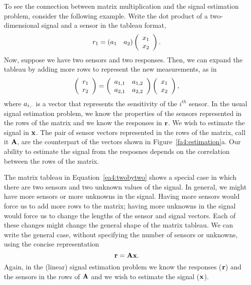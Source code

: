 To see the connection between matrix multiplication and the signal
estimation problem, consider the following example.  Write the dot
product of a two-dimensional signal and a sensor in the tableau
format,
\[
r_1 = 
\left ( \mbox{${a}_{1}$} ~~~ \mbox{${a}_{2}$} \right )
\left (
\begin{array}{c}
 \mbox{${x}_{1}$} \\
 \mbox{${x}_{2}$} \\
\end{array}
\right ) .
\]
Now, suppose we have two sensors and two responses.  Then, we can
expand the tableau by adding more rows to represent the new measurements,
as in
\begin{equation}
\label{ea4:twobytwo}
\left (
 \begin{array}{c}
  \mbox{${r}_{1}$} \\
  \mbox{${r}_{2}$}
 \end{array}
\right ) =
\left ( 
 \begin{array}{cc}
   \mbox{${a}_{1,1}$} & \mbox{${a}_{1,2}$} \\
   \mbox{${a}_{2,1}$} & \mbox{${a}_{2,2}$}
 \end{array}
\right )
\left (
\begin{array}{c}
 \mbox{${x}_{1}$} \\
 \mbox{${x}_{2}$} \\
\end{array}
\right ) ,
\end{equation}
where $\mbox{${a}_{i,\cdot}$}$ is a vector that represents the
sensitivity of the $i^{th}$ sensor.  In the usual signal estimation
problem, we know the properties of the sensors represented in the rows
of the matrix and we know the responses in $\mbox{${\bf r}$}$.  We wish to
estimate the signal in $\mbox{${\bf x}$}$.  The pair of sensor vectors
represented in the rows of the matrix, call it $\mbox{${\bf A}$}$, are the
counterpart of the vectors shown in Figure~\ref{fa4:estimation}a.  Our
ability to estimate the signal from the resposnes depends on the
correlation between the rows of the matrix.

The matrix tableau in Equation~\ref{ea4:twobytwo} shows a special case
in which there are two sensors and two unknown values of the signal.
In general, we might have more sensors or more unknowns in the signal.
Having more sensors would force us to add more rows to the matrix;
having more unknowns in the signal would force us to change the
lengths of the sensor and signal vectors.  Each of these changes might
change the general shape of the matrix tableau.  We can write the
general case, without specifying the number of sensors or unknowns,
using the concise representation
\begin{equation}
\label{ea4:linEstimation}
\mbox{${\bf r}$} = \mbox{${\bf A}$} \mbox{${\bf x}$} .
\end{equation}
Again, in the (linear) signal estimation problem we know the responses
($\mbox{${\bf r}$}$) and the sensors in the rows of $\mbox{${\bf A}$}$ and we wish to
estimate the signal ($\mbox{${\bf x}$}$).

